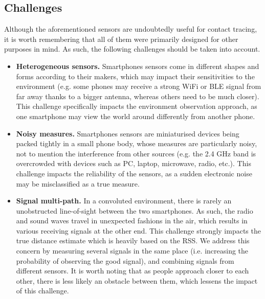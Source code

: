 \documentclass[graybox]{svmult}
\begin{document}
\subsection{Challenges}
Although the aforementioned sensors are undoubtedly useful for contact tracing, it is worth remembering that all of them were primarily designed for other purposes in mind. As such, the following challenges should be taken into account.
\begin{itemize}
    \item \textbf{Heterogeneous sensors.} Smartphones sensors come in different shapes and forms according to their makers, which may impact their sensitivities to the environment (e.g. some phones may receive a strong WiFi or BLE signal from far away thanks to a bigger antenna, whereas others need to be much closer). This challenge specifically impacts the environment observation approach, as one smartphone may view the world around differently from another phone. %
    
    \item \textbf{Noisy measures.} Smartphones sensors are miniaturised devices being packed tightly in a small phone body, whose measures are particularly noisy, not to mention the interference from other sources (e.g. the 2.4 GHz band is overcrowded with devices such as PC, laptop, microwave, radio, etc.). This challenge impacts the reliability of the sensors, as a sudden electronic noise may be misclassified as a true measure. %
    
    \item \textbf{Signal multi-path.} In a convoluted environment, there is rarely an unobstructed line-of-sight between the two smartphones. As such, the radio and sound waves travel in unexpected fashions in the air, which results in various receiving signals at the other end. This challenge strongly impacts the true distance estimate which is heavily based on the RSS. We address this concern by measuring several signals in the same place (i.e. increasing the probability of observing the good signal), and combining signals from different sensors. It is worth noting that as people approach closer to each other, there is less likely an obstacle between them, which lessens the impact of this challenge. 
\end{itemize}
\end{document}
